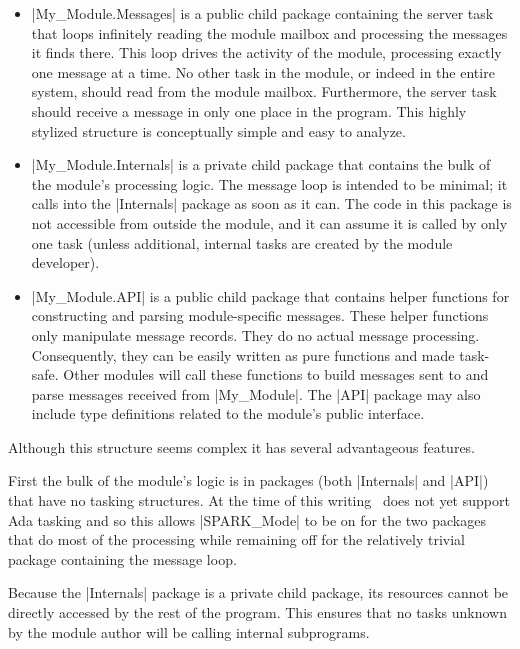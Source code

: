 \begin{itemize}
\item |My_Module.Messages| is a public child package containing the server task that loops
  infinitely reading the module mailbox and processing the messages it finds there. This loop
  drives the activity of the module, processing exactly one message at a time. No other task in
  the module, or indeed in the entire system, should read from the module mailbox. Furthermore,
  the server task should receive a message in only one place in the program. This highly
  stylized structure is conceptually simple and easy to analyze.

\item |My_Module.Internals| is a private child package that contains the bulk of the module's
  processing logic. The message loop is intended to be minimal; it calls into the |Internals|
  package as soon as it can. The code in this package is not accessible from outside the module,
  and it can assume it is called by only one task (unless additional, internal tasks are created
  by the module developer).

\item |My_Module.API| is a public child package that contains helper functions for constructing
  and parsing module-specific messages. These helper functions only manipulate message records.
  They do no actual message processing. Consequently, they can be easily written as pure
  functions and made task-safe. Other modules will call these functions to build messages sent
  to and parse messages received from |My_Module|. The |API| package may also include type
  definitions related to the module's public interface.
\end{itemize}

Although this structure seems complex it has several advantageous features.

First the bulk of the module's logic is in packages (both |Internals| and |API|) that have no
tasking structures. At the time of this writing \SPARK\ does not yet support Ada tasking and so
this allows |SPARK_Mode| to be on for the two packages that do most of the processing while
remaining off for the relatively trivial package containing the message loop.

Because the |Internals| package is a private child package, its resources cannot be directly
accessed by the rest of the program. This ensures that no tasks unknown by the module author
will be calling internal subprograms.

